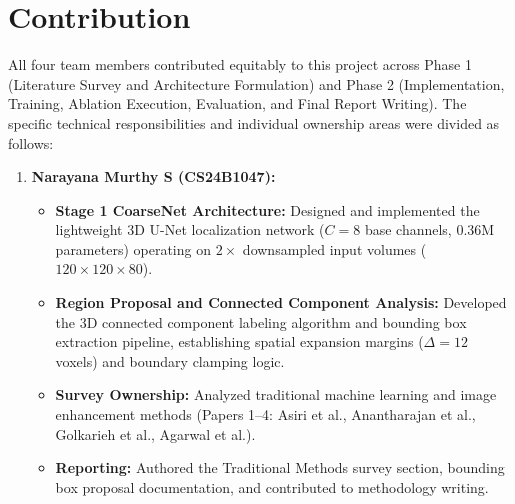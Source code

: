 \documentclass[12pt, a4paper]{article}
\begin{document}
\newpage
\section{Contribution}

All four team members contributed equitably to this project across Phase 1 (Literature Survey and Architecture Formulation) and Phase 2 (Implementation, Training, Ablation Execution, Evaluation, and Final Report Writing). The specific technical responsibilities and individual ownership areas were divided as follows:

\begin{enumerate}[leftmargin=*, itemsep=10pt]
    \item \textbf{Narayana Murthy S (CS24B1047):}
    \begin{itemize}[leftmargin=*, itemsep=3pt]
        \item \textbf{Stage 1 CoarseNet Architecture:} Designed and implemented the lightweight 3D U-Net localization network ($C=8$ base channels, 0.36M parameters) operating on $2\times$ downsampled input volumes ($120 \times 120 \times 80$).
        \item \textbf{Region Proposal and Connected Component Analysis:} Developed the 3D connected component labeling algorithm and bounding box extraction pipeline, establishing spatial expansion margins ($\Delta = 12$ voxels) and boundary clamping logic.
        \item \textbf{Survey Ownership:} Analyzed traditional machine learning and image enhancement methods (Papers 1--4: Asiri et al., Anantharajan et al., Golkarieh et al., Agarwal et al.).
        \item \textbf{Reporting:} Authored the Traditional Methods survey section, bounding box proposal documentation, and contributed to methodology writing.
    \end{itemize}


\end{enumerate}
\end{document}
